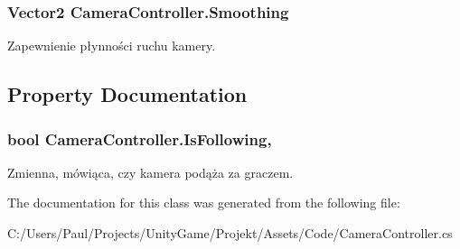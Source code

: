 \subsubsection[{Smoothing}]{\setlength{\rightskip}{0pt plus 5cm}Vector2 Camera\+Controller.\+Smoothing}\label{class_camera_controller_aaa266990dfb97f6e19d4dd6489f683ef}


Zapewnienie płynności ruchu kamery. 



\subsection{Property Documentation}
\hypertarget{class_camera_controller_a1eb503b3ec9f5c4b2f267e859ba37467}{}
\subsubsection[{Is\+Following}]{\setlength{\rightskip}{0pt plus 5cm}bool Camera\+Controller.\+Is\+Following\hspace{0.3cm}{\ttfamily [get]}, {\ttfamily [set]}}\label{class_camera_controller_a1eb503b3ec9f5c4b2f267e859ba37467}


Zmienna, mówiąca, czy kamera podąża za graczem. 



The documentation for this class was generated from the following file\+:\begin{DoxyCompactItemize}
\item 
C\+:/\+Users/\+Paul/\+Projects/\+Unity\+Game/\+Projekt/\+Assets/\+Code/Camera\+Controller.\+cs\end{DoxyCompactItemize}
